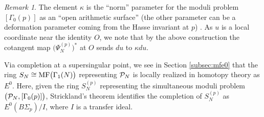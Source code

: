 \documentclass{gtpart}
\theoremstyle{definition}
\theoremstyle{remark}
\newtheorem{rmk}[thm]{Remark}
\newcommand{\CP}{{\cal P}}
\newcommand{\MF}{{\rm MF}}
\newcommand{\G}{\Gamma}
\newcommand{\K}{\kappa}
\renewcommand{\=}{\approx}
\renewcommand{\-}{\sim}
\numberwithin{equation}{section}
\numberwithin{thm}{section}
\begin{document}
\begin{rmk}
 \label{rmk:K}
 The element $\K$ is the ``norm'' parameter for the moduli problem $[\G_0(p)]$ as an ``open arithmetic surface'' 
 (the other parameter can be a deformation parameter coming from the Hasse invariant at $p$) \cite[Section 7.7]{KM}.  
 As $u$ is a local coordinate near the identity $O$, 
 we note that by the above construction the cotangent map $\big(\Psi_N^{(p)}\big)^*$ at $O$ sends $du$ to $\K du$.  
\end{rmk}

Via completion at a supersingular point, we see in Section \ref{subsec:mfe0} that the ring $S_N \cong \MF\big(\G_1(N)\big)$ representing $\CP_N$ is locally realized in homotopy theory as $E^0$.  
Here, given the ring $S_N^{(p)}$ representing the simultaneous moduli problem $\big(\CP_N,[\G_0(p)]\big)$, 
Strickland's theorem \cite[Theorem 1.1]{Str98} identifies the completion of $S_N^{(p)}$ as $E^0(B\Sigma_p) / I$, where $I$ is a transfer ideal.  
\end{document}
